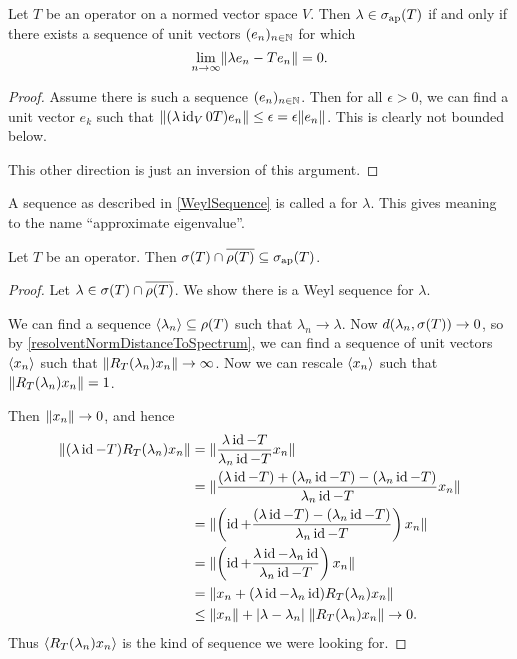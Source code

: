 \begin{proposition} \label{WeylSequence}
Let $T$ be an operator on a normed vector space $V$. Then $\lambda \in \sigma_\text{ap}(T)$ \textup{if and only if} there exists a sequence of unit vectors $(e_n)_{n\in\mathbb{N}}$ for which
\[ \lim_{n\to\infty}\lVert\lambda e_n - Te_n\rVert = 0. \]
\end{proposition}
\begin{proof}
Assume there is such a sequence $(e_n)_{n\in\mathbb{N}}$. Then for all $\epsilon>0$, we can find a unit  vector $e_k$ such that $\lVert(\lambda \operatorname{id}_V 0 T)e_n\rVert \leq \epsilon = \epsilon \lVert e_n\rVert$. This is clearly not bounded below.

This other direction is just an inversion of this argument.
\end{proof}
A sequence as described in \ref{WeylSequence} is called a  for $\lambda$. This gives meaning to the name ``approximate eigenvalue''.

\begin{corollary}
Let $T$ be an operator. Then $\sigma(T)\cap \overline{\rho(T)} \subseteq \sigma_\text{ap}(T)$.
\end{corollary}
\begin{proof}
Let $\lambda \in \sigma(T)\cap \overline{\rho(T)}$. We show there is a Weyl sequence for $\lambda$.

We can find a sequence $\left\langle \lambda_n \right\rangle\subseteq \rho(T)$ such that $\lambda_n \to \lambda$.
Now $d(\lambda_n, \sigma(T)) \to 0$, so by \ref{resolventNormDistanceToSpectrum}, we can find a sequence of unit vectors $\left\langle x_n \right\rangle$ such that $\lVert R_T(\lambda_n)x_n\rVert \to \infty$. Now we can rescale $\left\langle x_n \right\rangle$ such that $\lVert R_T(\lambda_n)x_n\rVert = 1$.

Then $\lVert x_n\rVert\to 0$, and hence
\begin{align*}
\lVert(\lambda\operatorname{id} - T)R_T(\lambda_n)x_n\rVert &= \lVert\frac{\lambda\operatorname{id} - T}{\lambda_n\operatorname{id} - T}x_n\rVert \\
&= \lVert\frac{(\lambda\operatorname{id} - T) + (\lambda_n\operatorname{id} - T) - (\lambda_n\operatorname{id} - T)}{\lambda_n\operatorname{id} - T}x_n\rVert \\
&= \lVert\left(\operatorname{id} + \frac{(\lambda\operatorname{id} - T) - (\lambda_n\operatorname{id} - T)}{\lambda_n\operatorname{id} - T}\right)x_n\rVert \\
&= \lVert\left(\operatorname{id} + \frac{\lambda\operatorname{id} - \lambda_n\operatorname{id}}{\lambda_n\operatorname{id} - T}\right)x_n\rVert \\
&= \lVert x_n + (\lambda\operatorname{id} - \lambda_n\operatorname{id})R_T(\lambda_n)x_n\rVert \\
&\leq \lVert x_n\rVert + |\lambda - \lambda_n|\;\lVert R_T(\lambda_n)x_n\rVert \to 0.
\end{align*}
Thus $\left\langle R_T(\lambda_n)x_n \right\rangle$ is the kind of sequence we were looking for.
\end{proof}


